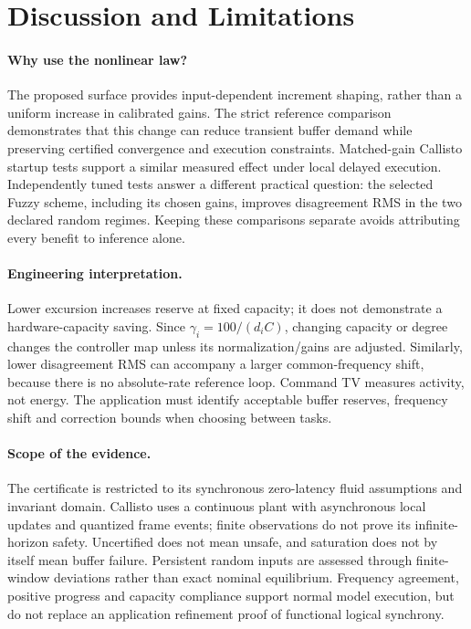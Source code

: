 \section{Discussion and Limitations}
\label{sec:discussion}

\paragraph{Why use the nonlinear law?}
The proposed surface provides input-dependent increment shaping,
rather than a uniform increase in calibrated gains. The strict
reference comparison demonstrates that this change can reduce
transient buffer demand while preserving certified convergence and
execution constraints. Matched-gain Callisto startup tests support a
similar measured effect under local delayed execution. Independently
tuned tests answer a different practical question: the selected
Fuzzy scheme, including its chosen gains, improves disagreement RMS
in the two declared random regimes. Keeping these comparisons
separate avoids attributing every benefit to inference alone.

\paragraph{Engineering interpretation.}
Lower excursion increases reserve at fixed capacity; it does not
demonstrate a hardware-capacity saving. Since $\gamma_i=100/(d_iC)$,
changing capacity or degree changes the controller map unless its
normalization/gains are adjusted. Similarly, lower disagreement RMS
can accompany a larger common-frequency shift, because there is no
absolute-rate reference loop. Command TV measures activity, not
energy. The application must identify acceptable buffer reserves,
frequency shift and correction bounds when choosing between tasks.

\paragraph{Scope of the evidence.}
The certificate is restricted to its synchronous zero-latency fluid
assumptions and invariant domain. Callisto uses a continuous
plant with asynchronous local updates and quantized frame events;
finite observations do not prove its infinite-horizon safety.
Uncertified does not mean unsafe, and saturation does not by itself
mean buffer failure. Persistent random inputs are assessed through
finite-window deviations rather than exact nominal equilibrium.
Frequency agreement, positive progress and capacity compliance
support normal model execution, but do not replace an application
refinement proof of functional logical synchrony.

